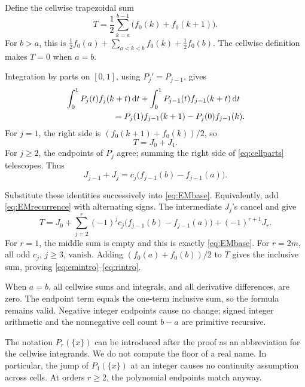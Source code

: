 \documentclass[11pt]{article}
\theoremstyle{definition}
\newcommand{\dd}{\,\mathrm{d}}
\begin{document}
Define the cellwise trapezoidal sum
\begin{equation}
 T=\frac12\sum_{k=a}^{b-1}\bigl(f_0(k)+f_0(k+1)\bigr).\label{eq:Tdef}
\end{equation}
For \(b>a\), this is
\(\tfrac12f_0(a)+\sum_{a<k<b}f_0(k)+\tfrac12f_0(b)\).
The cellwise definition makes \(T=0\) when \(a=b\).

Integration by parts on \([0,1]\), using \(P_j'=P_{j-1}\), gives
\begin{align}
 &\int_0^1P_j(t)f_j(k+t)\dd t
  +\int_0^1P_{j-1}(t)f_{j-1}(k+t)\dd t\notag\\
 &\hspace{2cm}=P_j(1)f_{j-1}(k+1)-P_j(0)f_{j-1}(k).\label{eq:cellparts}
\end{align}
For \(j=1\), the right side is
\((f_0(k+1)+f_0(k))/2\), so
\begin{equation}
 T=J_0+J_1.\label{eq:EMbase}
\end{equation}
For \(j\ge2\), the endpoints of \(P_j\) agree; summing the right
side of \eqref{eq:cellparts} telescopes.  Thus
\begin{equation}
 J_{j-1}+J_j=c_j\bigl(f_{j-1}(b)-f_{j-1}(a)\bigr).
 \label{eq:EMrecurrence}
\end{equation}

Substitute these identities successively into \eqref{eq:EMbase}.
Equivalently, add \eqref{eq:EMrecurrence} with alternating signs.
The intermediate \(J_j\)'s cancel and give
\begin{equation}
 T=J_0+\sum_{j=2}^r(-1)^jc_j
       \bigl(f_{j-1}(b)-f_{j-1}(a)\bigr)+(-1)^{r+1}J_r.
 \label{eq:EMgeneral}
\end{equation}
For \(r=1\), the middle sum is empty and this is exactly
\eqref{eq:EMbase}.  For \(r=2m\), all odd \(c_j\), \(j\ge3\),
vanish.  Adding \((f_0(a)+f_0(b))/2\) to \(T\) gives the inclusive
sum, proving \eqref{eq:emintro}--\eqref{eq:rintro}.

When \(a=b\), all cellwise sums and integrals, and all derivative
differences, are zero.  The endpoint term equals the one-term inclusive
sum, so the formula remains valid.  Negative integer endpoints cause
no change; signed integer arithmetic and the nonnegative cell count
\(b-a\) are primitive recursive.

The notation \(P_r(\{x\})\) can be introduced after the proof as an
abbreviation for the cellwise integrands.  We do not compute the floor
of a real name.  In particular, the jump of \(P_1(\{x\})\) at an
integer causes no continuity assumption across cells.  At orders
\(r\ge2\), the polynomial endpoints match anyway.
\end{document}
